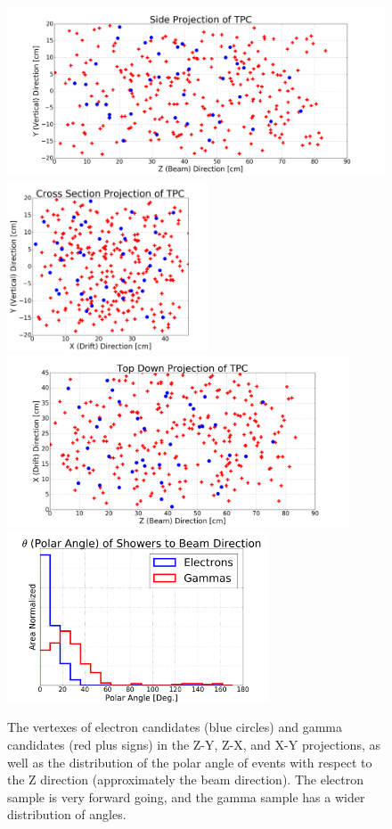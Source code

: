 \begin{figure}[p]
   \centering
   
   \includegraphics[height=2in]{emshower_figures/yz_projection.png}
   \includegraphics[height=2in]{emshower_figures/xy_projection.png}
   \includegraphics[height=2in]{emshower_figures/xz_projection.png}
   \includegraphics[height=2in]{emshower_figures/theta_distribution.png}
   \caption{The vertexes of electron candidates (blue circles) and gamma candidates (red plus signs) in the Z-Y, Z-X, and X-Y projections, as well as the distribution of the polar angle of events with respect to the Z direction (approximately the beam direction).  The electron sample is very forward going, and the gamma sample has a wider distribution of angles. }
   \label{fig:geomety_dists}
 \end{figure} 

